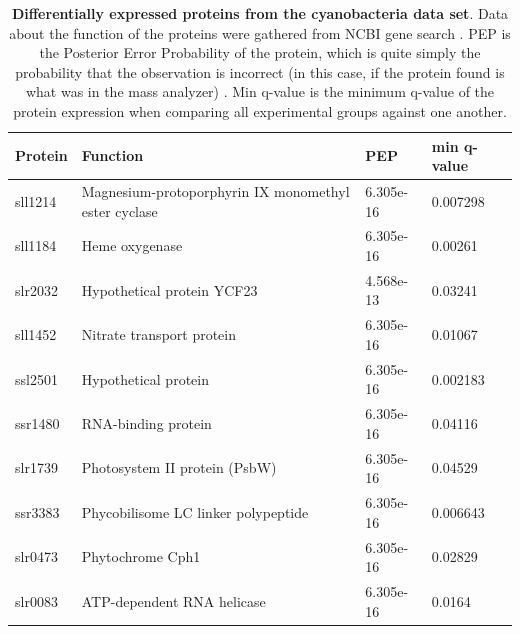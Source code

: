 \begin{center}
\begin{table}[H]
\caption{\textbf{Differentially expressed proteins from the cyanobacteria data set}. Data about the function of the proteins were gathered from NCBI gene search \cite{ncbi-search}. PEP is the Posterior Error Probability of the protein, which is quite simply the probability that the observation is incorrect (in this case, if the protein found is what was in the mass analyzer) \cite{q-value}. Min q-value is the minimum q-value of the protein expression when comparing all experimental groups against one another.}
\begin{tabular}{ l l l l }
\toprule
Protein & Function & PEP & min q-value \\ \midrule
sll1214 & Magnesium-protoporphyrin IX monomethyl ester cyclase  & 6.305e-16 & 0.007298 \\ [0.5ex]
sll1184 & Heme oxygenase & 6.305e-16 & 0.00261 \\ [0.5ex]
slr2032 & Hypothetical protein YCF23 & 4.568e-13 & 0.03241 \\ [0.5ex]
sll1452 & Nitrate transport protein & 6.305e-16 & 0.01067 \\ [0.5ex]
ssl2501 & Hypothetical protein & 6.305e-16 & 0.002183 \\ [0.5ex]
ssr1480 & RNA-binding protein  & 6.305e-16 & 0.04116 \\ [0.5ex]
slr1739 & Photosystem II protein (PsbW) & 6.305e-16 & 0.04529 \\ [0.5ex]
ssr3383 & Phycobilisome LC linker polypeptide & 6.305e-16 & 0.006643 \\ [0.5ex]
slr0473 & Phytochrome Cph1 & 6.305e-16 & 0.02829 \\ [0.5ex]
slr0083 & ATP-dependent RNA helicase  & 6.305e-16 & 0.0164 \\ [0.5ex] \bottomrule
\end{tabular}
\centering
\label{table:cyano-proteins}
\end{table}
\end{center}

